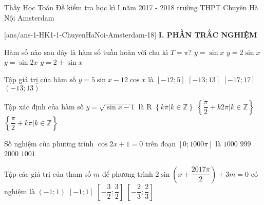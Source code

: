 
	\begin{name}
		{Thầy Học Toán}
		{Đề kiểm tra học kì I năm 2017 - 2018 trường THPT Chuyên Hà Nội Amsterdam}
	\end{name}
	\setcounter{ex}{0}\setcounter{bt}{0}
	[ans/ans-1-HK1-1-ChuyenHaNoi-Amsterdam-18]
\noindent\textbf{I. PHẦN TRẮC NGHIỆM}

\begin{ex}%
Hàm số nào sau đây là hàm số tuần hoàn với chu kì $T=\pi$?
\choice
{$y=\sin x$}
{$y=2\sin x$}
{\True $y=\sin 2x$}
{$y=2+\sin x$}
\end{ex}

\begin{ex}%
Tập giá trị của hàm số $y=5\sin x-12\cos x$ là 
\choice
{$[-12;5]$}
{\True $[-13;13]$}
{$[-17;17]$}
{$(-13;13)$}
\end{ex}

\begin{ex}%
Tập xác định của hàm số $y=\sqrt{\sin x-1}$ là 
\choice
{$\mathrm{R}$}
{$\left\{k\pi |k\in\mathbb{Z}\right\}$}
{\True $\left\{\dfrac{\pi}{2}+k2\pi\Big| k\in\mathbb{Z}\right\}  $}
{$\left\{\dfrac{\pi}{2}+k\pi\Big|k\in\mathbb{Z}\right\}$}
\end{ex}

\begin{ex}%
Số nghiệm của phương trình $\cos 2x+1=0$ trên đoạn $[0;1000\pi ]$ là
\choice
{\True $1000$}
{$999$}
{$2000$}
{$1001$}
\end{ex}

\begin{ex}%
Tập các giá trị của tham số $m$ để phương trình $2\sin\left(x+\dfrac{2017\pi}{2}\right)+3m=0$ có nghiệm là
\choice
{$(-1;1)$}
{$[-1;1]$}
{$\left[-\dfrac{3}{2};\dfrac{3}{2}\right]$}
{\True $\left[-\dfrac{2}{3};\dfrac{2}{3}\right]$}
\end{ex}

